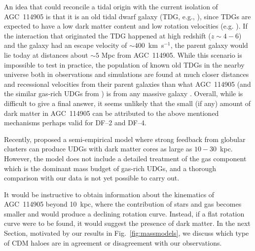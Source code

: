 \documentclass[fleqn,usenatbib]{mnras}
\begin{document}
An idea that could reconcile a tidal origin with the current isolation of AGC~114905 is that it is an old tidal dwarf galaxy (TDG, e.g., \citealt{duc_tdgs}), since TDGs are expected to have a low dark matter content and low rotation velocities (e.g. \citealt{hunter_tdgs2000,lelli_tdgs}). If the interaction that originated the TDG happened at high redshift ($z \sim 4-6$) and the galaxy had an escape velocity of $\sim 400$~km~s$^{-1}$, the parent galaxy would lie today at distances about $\sim 5$ Mpc from AGC~114905. While this scenario is impossible to test in practice, the population of known old TDGs in the nearby universe both in observations and simulations are found at much closer distances and recessional velocities from their parent galaxies than what AGC~114905 (and the similar gas-rich UDGs from \citealt{huds2019,huds2020}) is from any massive galaxy \citep{hunter_tdgs2000,kaviraj_tdgs,duc_tdgs,haslbauer_UDGsnoDMIllustris}. Overall, while is difficult to give a final answer, it seems unlikely that the small (if any) amount of dark matter in AGC~114905 can be attributed to the above mentioned mechanisms perhaps valid for DF--2 and DF--4. 

Recently, \citet{trujillogomez_udgs} proposed a semi-empirical model where strong feedback from globular clusters can produce UDGs with dark matter cores as large as $10-30$~kpc. However, the model does not include a detailed treatment of the gas component which is the dominant mass budget of gas-rich UDGs, and a thorough comparison with our data is not yet possible to carry out.

It would be instructive to obtain information about the kinematics of AGC~114905 beyond 10~kpc, where the contribution of stars and gas becomes smaller and would produce a declining rotation curve. Instead, if a flat rotation curve were to be found, it would suggest the presence of dark matter. In the next Section, motivated by our results in Fig.~\ref{fig:massmodels}, we discuss which type of CDM haloes are in agreement or disagreement with our observations.
\end{document}
